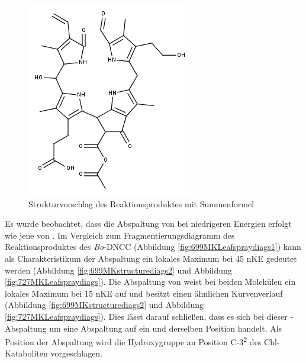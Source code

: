 \begin{figure}[!htbp]
  \centering
  \includegraphics[scale=0.6]{figures/Kapitel4/Kataboliten/fragmentation_structures/VWA_Katabolit_727.png}
  \caption[Strukturvorschlag des Reaktionsproduktes von \textit{Bo}-NCC-3, Quelle: Autor]{Strukturvorschlag des Reaktionsproduktes mit Summenformel }
  \label{fig:727MKstructure}
\end{figure}

Es wurde beobachtet, dass die Abspaltung von  bei niedrigeren Energien erfolgt wie jene von . Im Vergleich zum Fragmentierungsdiagramm des Reaktionsproduktes des \textit{Bo}-DNCC (Abbildung \ref{fig:699MKLeafspraydiags1}) kann als Charakteristikum der  Abspaltung ein lokales Maximum bei 45 \gls{nKE} gedeutet werden (Abbildung \ref{fig:699MKstructurediags2} und Abbildung \ref{fig:727MKLeafspraydiags}). Die Abspaltung von  weist bei beiden Molekülen ein lokales Maximum bei 15 \gls{nKE} auf und besitzt einen ähnlichen Kurvenverlauf (Abbildung \ref{fig:699MKstructurediags2} und Abbildung \ref{fig:727MKLeafspraydiags}). Dies lässt darauf schließen, dass es sich bei dieser -Abspaltung um eine Abspaltung auf ein und derselben Position handelt. Als Position der Abspaltung wird die Hydroxygruppe an Position C-3\textsuperscript{2} des Chl-Kataboliten vorgeschlagen. 

